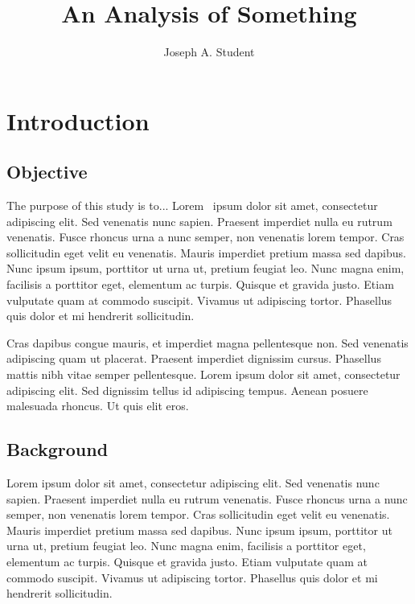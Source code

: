 \documentclass[double,12pt]{beavtex}
\title{An Analysis of Something}
\author{Joseph A. Student}
\begin{document}
\maketitle
\mainmatter


\chapter{Introduction}

\section{Objective}

The purpose of this study is to... Lorem~\cite{smith} ipsum dolor sit amet, consectetur adipiscing elit. Sed venenatis nunc sapien. Praesent imperdiet nulla eu rutrum venenatis. Fusce rhoncus urna a nunc semper, non venenatis lorem tempor. Cras sollicitudin eget velit eu venenatis. Mauris imperdiet pretium massa sed dapibus. Nunc ipsum ipsum, porttitor ut urna ut, pretium feugiat leo. Nunc magna enim, facilisis a porttitor eget, elementum ac turpis. Quisque et gravida justo. Etiam vulputate quam at commodo suscipit. Vivamus ut adipiscing tortor. Phasellus quis dolor et mi hendrerit sollicitudin. 

Cras dapibus congue mauris, et imperdiet magna pellentesque non. Sed venenatis adipiscing quam ut placerat. Praesent imperdiet dignissim cursus. Phasellus mattis nibh vitae semper pellentesque. Lorem ipsum dolor sit amet, consectetur adipiscing elit. Sed dignissim tellus id adipiscing tempus. Aenean posuere malesuada rhoncus. Ut quis elit eros.


\section{Background}

Lorem ipsum dolor sit amet, consectetur adipiscing elit. Sed venenatis nunc sapien. Praesent imperdiet nulla eu rutrum venenatis. Fusce rhoncus urna a nunc semper, non venenatis lorem tempor. Cras sollicitudin eget velit eu venenatis. Mauris imperdiet pretium massa sed dapibus. Nunc ipsum ipsum, porttitor ut urna ut, pretium feugiat leo. Nunc magna enim, facilisis a porttitor eget, elementum ac turpis. Quisque et gravida justo. Etiam vulputate quam at commodo suscipit. Vivamus ut adipiscing tortor. Phasellus quis dolor et mi hendrerit sollicitudin. 
\end{document}
